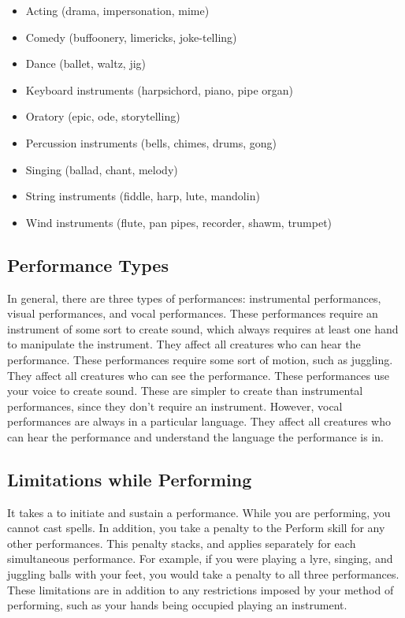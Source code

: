         \begin{itemize}
            \item Acting (drama, impersonation, mime)
            \item Comedy (buffoonery, limericks, joke-telling)
            \item Dance (ballet, waltz, jig)
            \item Keyboard instruments (harpsichord, piano, pipe organ)
            \item Oratory (epic, ode, storytelling)
            \item Percussion instruments (bells, chimes, drums, gong)
            \item Singing (ballad, chant, melody)
            \item String instruments (fiddle, harp, lute, mandolin)
            \item Wind instruments (flute, pan pipes, recorder, shawm, trumpet)
        \end{itemize}

        \subsection{Performance Types}
            In general, there are three types of performances: instrumental performances, visual performances, and vocal performances.
             These performances require an instrument of some sort to create sound, which always requires at least one hand to manipulate the instrument.
            They affect all creatures who can hear the performance.
             These performances require some sort of motion, such as juggling.
            They affect all creatures who can see the performance.
             These performances use your voice to create sound.
            These are simpler to create than instrumental performances, since they don't require an instrument.
            However, vocal performances are always in a particular language.
            They affect all creatures who can hear the performance and understand the language the performance is in.

        \subsection{Limitations while Performing}
            It takes a  to initiate and sustain a performance.
            While you are performing, you cannot cast spells.
            In addition, you take a  penalty to the Perform skill for any other performances.
            This penalty stacks, and applies separately for each simultaneous performance.
            For example, if you were playing a lyre, singing, and juggling balls with your feet, you would take a  penalty to all three performances.
            These limitations are in addition to any restrictions imposed by your method of performing, such as your hands being occupied playing an instrument.

